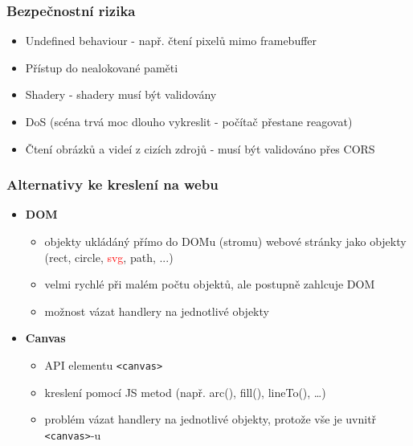 \documentclass{beamer}
\begin{document}

	\begin{frame}[t,fragile]
		\frametitle{Bezpečnostní rizika}					
		\begin{itemize}
			\item Undefined behaviour - např. čtení pixelů mimo framebuffer
			\item Přístup do nealokované paměti
			\item Shadery - shadery musí být validovány
			\item DoS (scéna trvá moc dlouho vykreslit - počítač přestane reagovat)
			\item Čtení obrázků a videí z cizích zdrojů - musí být validováno přes CORS	
		\end{itemize}	

	\end{frame}
	
	

	
	
		\begin{frame}[t,fragile]
		\frametitle{Alternativy ke kreslení na webu}					
		\begin{itemize}
		
		\item \textbf{DOM}
		\begin{itemize}
			\item objekty ukládáný přímo do DOMu (stromu) webové stránky jako objekty (rect, circle, \textcolor{red}{svg}, path, ...)
			\item velmi rychlé při malém počtu objektů, ale postupně zahlcuje DOM
			\item možnost vázat handlery na jednotlivé objekty
		\end{itemize}

		\item \textbf{Canvas}
		\begin{itemize}
			\item API elementu \verb|<canvas>|
			\item kreslení pomocí JS metod (např. arc(), fill(), lineTo(), \dots)
			\item problém vázat handlery na jednotlivé objekty, protože vše je uvnitř \verb|<canvas>|-u
		\end{itemize}				
				
		\end{itemize}	

	\end{frame}
	
\end{document}
